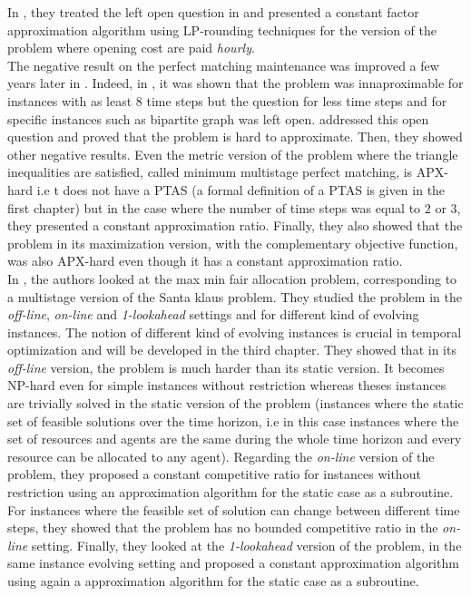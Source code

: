 \documentclass[a4paper]{book}
\begin{document}
In \cite{an2017dynamic}, they treated the left open question in \cite{Eisenstat} and presented a constant factor approximation algorithm using LP-rounding techniques for the version of the problem where opening cost are paid \textit{hourly}.\\
The negative result on the {\sc perfect matching maintenance} was improved a few years later in \cite{bampis2018multistage}. Indeed, in \cite{Gupta}, it was shown that the problem was innaproximable for instances with as least $8$ time steps but the question for less time steps and for specific instances such as bipartite graph was left open. \cite{bampis2018multistage} addressed this open question and proved that the problem is hard to approximate. Then, they showed other negative results. Even the metric version of the problem where the triangle inequalities are satisfied, called {\sc minimum multistage perfect matching}, is APX-hard i.e t does not have a PTAS (a formal definition of a PTAS is given in the first chapter) but in the case where the number of time steps was equal to $2$ or $3$, they presented a constant approximation ratio. Finally, they also showed that the problem in its maximization version, with the complementary objective function, was also APX-hard even though it has a constant approximation ratio. \\
In \cite{bampis2018fair}, the authors looked at the {\sc max min fair allocation} problem, corresponding to a multistage version of the {\sc Santa klaus} problem. They studied the problem in the \emph{off-line}, \emph{on-line} and \emph{1-lookahead} settings and for different kind of evolving instances. The notion of different kind of evolving instances is crucial in temporal optimization and will be developed in the third chapter. They showed that in its \emph{off-line} version, the problem is much harder than its static version. It becomes NP-hard even for simple instances without restriction whereas theses instances are trivially solved in the static version of the problem (instances where the static set of feasible solutions over the time horizon, i.e in this case instances where the set of resources and agents are the same during the whole time horizon and every resource can be allocated to any agent). Regarding the \emph{on-line} version of the problem, they proposed a constant competitive ratio for instances without restriction using an approximation algorithm for the static case as a subroutine. For instances where the feasible set of solution can change between different time steps, they showed that the problem has no bounded competitive ratio in the \emph{on-line} setting. Finally, they looked at the \emph{1-lookahead} version of the problem, in the same instance evolving setting and proposed a constant approximation algorithm using again a approximation algorithm for the static case as a subroutine. \\
\end{document}
